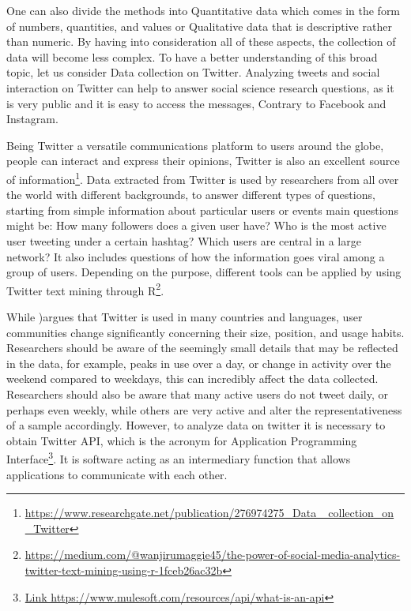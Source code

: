 One can also divide the methods into Quantitative data which comes in the form of numbers, quantities, and values or Qualitative data that is descriptive rather than numeric. By having into consideration all of these aspects, the collection of data will become less complex. To have a better understanding of this broad topic, let us consider Data collection on Twitter. 
Analyzing tweets and social interaction on Twitter can help to answer social science research questions, as it is very public and it is easy to access the messages, Contrary to Facebook and Instagram. 

Being Twitter a versatile communications platform to users around the globe, people can interact and express their opinions, Twitter is also an excellent source of information\footnote{\href{https://www.researchgate.net/publication/276974275_Data_collection_on_Twitter}{https://www.researchgate.net/publication/276974275\_Data	\_collection\_on	\_Twitter}}. Data extracted from Twitter is used by researchers from all over the world with different backgrounds, to answer different types of questions, starting from simple information about particular users or events main questions might be: How many followers does a given user have? Who is the most active user tweeting under a certain hashtag? Which users are central in a large network? It also includes questions of how the information goes viral among a group of users. Depending on the purpose, different tools can be applied by using Twitter text mining through R\footnote{\href{https://medium.com/@wanjirumaggie45/the-power-of-social-media-analytics-twitter-text-mining-using-r-1fceb26ac32b}{https://medium.com/@wanjirumaggie45/the-power-of-social-media-analytics-twitter-text-mining-using-r-1fceb26ac32b}}.

While \citep{inbook})argues that Twitter is used in many countries and languages, user communities change significantly concerning their size, position, and usage habits. Researchers should be aware of the seemingly small details that may be reflected in the data, for example, peaks in use over a day, or change in activity over the weekend compared to weekdays, this can incredibly affect the data collected. Researchers should also be aware that many active users do not tweet daily, or perhaps even weekly, while others are very active and alter the representativeness of a sample accordingly.
However, to analyze data on twitter it is necessary to obtain Twitter API, which is the acronym for Application Programming Interface\footnote{\href{ https://www.mulesoft.com/resources/api/what-is-an-api}{Link https://www.mulesoft.com/resources/api/what-is-an-api}}. It is software acting as an intermediary function that allows applications to communicate with each other. 

